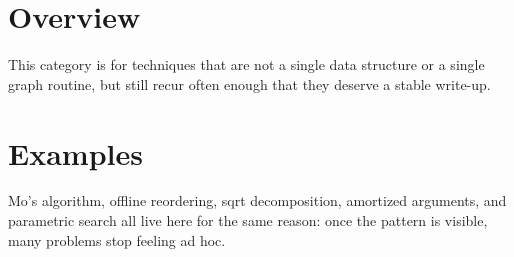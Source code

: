 \section*{Overview}

This category is for techniques that are not a single data structure or a single graph routine, but still recur
often enough that they deserve a stable write-up.

\section*{Examples}

Mo's algorithm, offline reordering, sqrt decomposition, amortized arguments, and parametric search all live here for
the same reason: once the pattern is visible, many problems stop feeling ad hoc.
